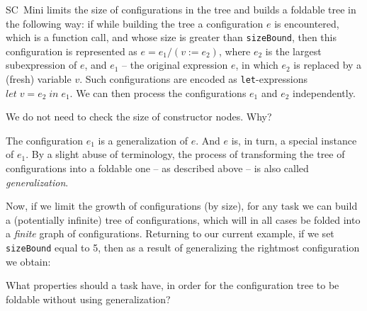 
SC~Mini limits the size of configurations in the tree and builds a foldable tree in the following way: 
if while building the tree a configuration $e$ is encountered, 
which is a function call,
and whose size is greater than \texttt{sizeBound},
then this configuration is represented as $e = e_1 / (v := e_2)$, 
where $e_2$ is the largest subexpression of $e$, and $e_1$ -- 
the original expression $e$, in which $e_2$ is replaced by a (fresh) variable $v$.
Such configurations are encoded as \texttt{let}-expressions $let\;v = e_2 \;in \;e_1$.
We can then process the configurations $e_1$ and $e_2$ independently.

\begin{exercise}
We do not need to check the size of constructor nodes. Why?
\end{exercise}

The configuration $e_1$ is a generalization of $e$. 
And $e$ is, in turn, a special instance of $e_1$.
By a slight abuse of terminology, the process of transforming the
tree of configurations into a foldable one -- as described above --
is also called \emph{generalization}.

Now, if we limit the growth of configurations (by size),
for any task we can build a (potentially infinite) tree of configurations,
which will in all cases be folded into a \emph{finite} graph of configurations.
Returning to our current example, if we set \texttt{sizeBound} equal to 5, then as
a result of generalizing the rightmost configuration we obtain:\\


\begin{exercise} 
What properties should a task have, in order for the configuration
tree to be foldable without using generalization?
\end{exercise}


